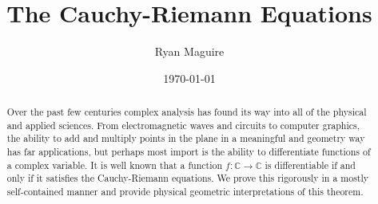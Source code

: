 \documentclass{article}
\title{The Cauchy-Riemann Equations}
\author{Ryan Maguire}
\date{\today}
\theoremstyle{definition}
\begin{document}
    \maketitle
    \begin{abstract}
        Over the past few centuries complex analysis has found its way into all
        of the physical and applied sciences. From electromagnetic waves and
        circuits to computer graphics, the ability to add and multiply points
        in the plane in a meaningful and geometry way has far applications,
        but perhaps most import is the ability to differentiate functions of
        a complex variable. It is well known that a function
        $f:\mathbb{C}\rightarrow\mathbb{C}$ is differentiable if and only if
        it satisfies the Cauchy-Riemann equations. We prove this rigorously
        in a mostly self-contained manner and provide physical geometric
        interpretations of this theorem.
    \end{abstract}
    \tableofcontents
\end{document}
